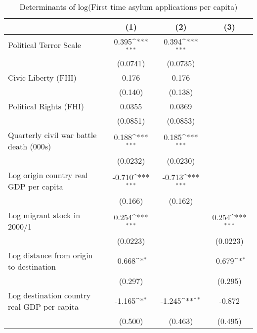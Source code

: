 \begin{table}[htbp]\centering
\def\sym#1{\ifmmode^{#1}\else\(^{#1}\)\fi}
\caption{Determinants of log(First time asylum applications per capita)}
\begin{tabular}{l*{3}{c}}
\hline\hline
                    &\multicolumn{1}{c}{(1)}         &\multicolumn{1}{c}{(2)}         &\multicolumn{1}{c}{(3)}         \\
\hline
Political Terror Scale&       0.395\sym{***}&       0.394\sym{***}&                     \\
                    &    (0.0741)         &    (0.0735)         &                     \\
[1em]
Civic Liberty (FHI) &       0.176         &       0.176         &                     \\
                    &     (0.140)         &     (0.138)         &                     \\
[1em]
Political Rights (FHI)&      0.0355         &      0.0369         &                     \\
                    &    (0.0851)         &    (0.0853)         &                     \\
[1em]
Quarterly civil war battle death (000s)&       0.188\sym{***}&       0.185\sym{***}&                     \\
                    &    (0.0232)         &    (0.0230)         &                     \\
[1em]
Log origin country real GDP per capita&      -0.710\sym{***}&      -0.713\sym{***}&                     \\
                    &     (0.166)         &     (0.162)         &                     \\
[1em]
Log migrant stock in 2000/1&       0.254\sym{***}&                     &       0.254\sym{***}\\
                    &    (0.0223)         &                     &    (0.0223)         \\
[1em]
Log distance from origin to destination&      -0.668\sym{*}  &                     &      -0.679\sym{*}  \\
                    &     (0.297)         &                     &     (0.295)         \\
[1em]
Log destination country real GDP per capita&      -1.165\sym{*}  &      -1.245\sym{**} &      -0.872         \\
                    &     (0.500)         &     (0.463)         &     (0.495)         \\

\end{tabular}
\end{table}
